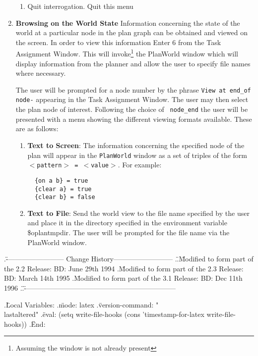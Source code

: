 \begin{enumerate}
\begin{enumerate}
\item Quit interrogation. Quit this menu
\end{enumerate}

\item {\bf Browsing on the World State} \newline
Information concerning the state of the world at a particular node in
the plan graph can be obtained and viewed on the screen. In order to
view this information Enter 6 from the Task Assignment Window. 
This will invoke\footnote{Assuming the window is not already present}
the PlanWorld window which will display information from the planner
and allow the user to specify file names where necessary. 

The user will be prompted for a node number by the phrase {\tt View at
end\_of node-} appearing in the Task Assignment Window. The user may
then select the plan node of interest. Following the choice of {\tt
node\_end} the user will be presented with a menu showing the
different viewing formats available. These are as follows:  
 
\begin{enumerate}
\item {\bf Text to Screen}: 
The information concerning the specified node of the plan will appear
in the {\tt PlanWorld} window as a set of triples of the form {\tt
$<$pattern$>$ = $<$value$>$}. For example:  

\begin{verbatim}
  {on a b} = true
  {clear a} = true
  {clear b} = false
\end{verbatim} 

\item {\bf Text to File}: Send the world view to the file name
specified by the user and place it in the directory specified in the
environment variable {\sc \$oplantmpdir}. The user will be prompted
for the file name via the PlanWorld window. 
\end{enumerate}
\end{enumerate}


.\" ------------------------- Change History--------------------------
.\"
.\" Modified to form part of the 2.2 Release: BD: June 29th 1994
.\" Modified to form part of the 2.3 Release: BD: March 14th 1995
.\" Modified to form part of the 3.1 Release: BD: Dec 11th 1996
.\"
.\" ------------------------------------------------------------------


.\" Local Variables:
.\" mode: latex
.\" version-command: "\\lastaltered"
.\" eval: (setq write-file-hooks (cons 'timestamp-for-latex write-file-hooks))
.\" End:
